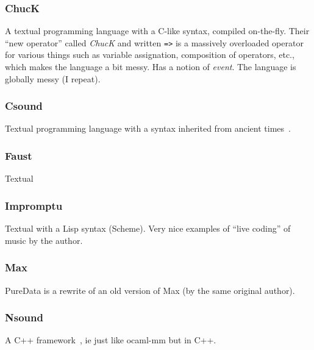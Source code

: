 \documentclass[a4paper,titlepage]{article}
\begin{document}

\subsubsection{ChucK}
A textual programming language with a C-like syntax, compiled
on-the-fly\cite{chuck}. Their ``new operator'' called \emph{ChucK} and written
\texttt{=>} is a massively overloaded operator for various things such as
variable assignation, composition of operators, etc., which makes the language a
bit messy. Has a notion of \emph{event}. The language is globally messy (I
repeat).

\subsubsection{Csound}
Textual programming language with a syntax inherited from ancient
times~\cite{csound}.

\subsubsection{Faust}
\cite{faust}
Textual

\subsubsection{Impromptu}
\cite{impromptu} Textual with a Lisp syntax (Scheme). Very nice examples of ``live
coding'' of music by the author.

\subsubsection{Max}
\cite{max}
PureData is a rewrite of an old version of Max (by the same original author).

\subsubsection{Nsound}
A C++ framework~\cite{nsound}, ie just like ocaml-mm but in C++.
\end{document}
